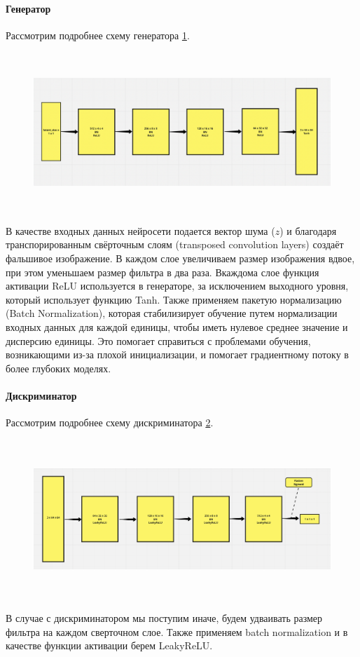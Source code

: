 \paragraph{Генератор}

Рассмотрим подробнее схему генератора {\color{blue} \ref{fig.generator_scheme_DCGAN}}.
\begin{figure}
    \centering
    \includegraphics[height=60mm]{fig/generator_scheme_DCGAN.png}
    \caption{}
    \label{fig.generator_scheme_DCGAN}
\end{figure}
В качестве входных данных нейросети подается вектор шума ($z$) и благодаря транспорированным свёрточным слоям (transposed convolution layers) создаёт фальшивое изображение. В каждом слое увеличиваем размер изображения вдвое, при этом уменьшаем размер фильтра в два раза. Вкаждома слое функция активации ReLU используется в генераторе, за исключением выходного уровня, который использует функцию Tanh.
Также применяем пакетую нормализацию (Batch Normalization), которая стабилизирует обучение путем нормализации входных данных для каждой единицы, чтобы иметь нулевое среднее значение и дисперсию единицы. Это помогает справиться с проблемами обучения, возникающими из-за плохой инициализации, и помогает градиентному потоку в более глубоких моделях.

\paragraph{Дискриминатор}

Рассмотрим подробнее схему дискриминатора {\color{blue} \ref{fig.discriminator_scheme_DCGAN}}.
\begin{figure}
    \centering
    \includegraphics[height=60mm]{fig/discriminator_scheme_DCGAN.png}
    \caption{}
    \label{fig.discriminator_scheme_DCGAN}
\end{figure}
В случае с дискриминатором мы поступим иначе, будем удваивать размер фильтра на каждом сверточном слое. Также применяем batch normalization и в качестве функции активации берем LeakyReLU.

